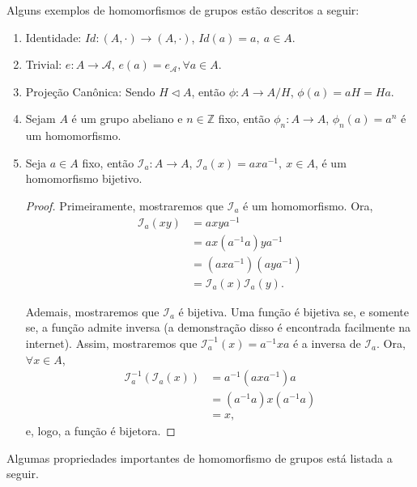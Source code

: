 \documentclass[11pt,openany]{book}
\begin{document}
Alguns exemplos de homomorfismos de grupos estão descritos a seguir:
\begin{enumerate}[label=Exemplo \arabic*),align=left]
    \item Identidade: $Id: (A,\cdot) \rightarrow (A, \cdot)$, $Id(a) = a, \ a \in A$.
    \item Trivial: $e: A \rightarrow \mathcal{A}$, $e(a) = e_\mathcal{A}, \forall a \in A$.
    \item Projeção Canônica: Sendo $H \triangleleft A$, então $\phi: A \rightarrow A/H$, $\phi(a) = aH = Ha$.
    \item Sejam $A$ é um grupo abeliano e $n \in \mathbb{Z}$ fixo, então $\phi_n: A \rightarrow A$, $\phi_n(a) = a^n$ é um homomorfismo.
    \item Seja $a \in A$ fixo, então $\mathcal{I}_a: A \rightarrow A$, $\mathcal{I}_a(x) = axa^{-1}, \ x\in A$, é um homomorfismo bijetivo.

    \begin{proof}
        Primeiramente, mostraremos que $\mathcal{I}_a$ é um homomorfismo. Ora,
        \begin{align*}
            \mathcal{I}_a(xy) &= axya^{-1} \\
            &= ax(a^{-1}a)ya^{-1} \\
            &= (axa^{-1})(aya^{-1}) \\
            &= \mathcal{I}_a(x)\mathcal{I}_a(y).
        \end{align*}

        Ademais, mostraremos que $\mathcal{I}_a$ é bijetiva. Uma função é bijetiva se, e somente se, a função admite inversa (a demonstração disso é encontrada facilmente na internet). Assim, mostraremos que $\mathcal{I}_a^{-1}(x) = a^{-1}xa$ é a inversa de $\mathcal{I}_a$. Ora, $\forall x \in A$,
        \begin{align*}
            \mathcal{I}_a^{-1}(\mathcal{I}_a(x) ) &= a^{-1}(axa^{-1})a \\
            &= (a^{-1}a)x(a^{-1}a) \\
            &= x,
        \end{align*}
        e, logo, a função é bijetora.
    \end{proof}
\end{enumerate}

Algumas propriedades importantes de homomorfismo de grupos está listada a seguir.
\end{document}
